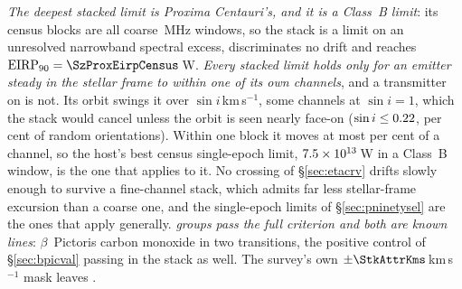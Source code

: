 \emph{The deepest stacked limit is Proxima Centauri's, and it is a Class~B
limit}: its \SxProxEbCensus{} census blocks are all coarse \ChanBModeMHz\,MHz
windows, so the stack is a limit on an unresolved narrowband spectral
excess, discriminates
no drift and reaches $\mathrm{EIRP}_{90}=\SzProxEirpCensus$\,W. \emph{Every
stacked limit holds only for an emitter steady in the stellar frame to within
one of its own channels}, and a transmitter on \PxPlanet{} is not. Its orbit
\citep{AngladaEscude2016,Kervella2017,NEA2013} swings it over
\PxPPKms$\sin i$\,km\,s$^{-1}$, some \PxNChanWalk{} channels at $\sin i=1$,
which the stack would cancel unless the orbit is seen nearly face-on
($\sin i\le0.22$, \PxIsoPct{} per cent of random orientations). Within one block it moves at most \PxBlockPct{} per cent of a channel, so the
host's best census single-epoch limit, $7.5\times10^{13}$\,W in a Class~B
window, is the one that applies to it. No crossing of
\S\ref{sec:etacrv} drifts slowly enough to survive a fine-channel stack,
which admits far less stellar-frame excursion than a coarse one, and the
single-epoch limits of \S\ref{sec:pninetysel} are
the ones that apply generally. \emph{\StkNSurvive{} groups pass the full
criterion and both are known lines}: $\beta$~Pictoris carbon monoxide in two
transitions, the positive control of \S\ref{sec:bpicval} passing in the stack
as well. The survey's own $\pm\StkAttrKms$\,km\,s$^{-1}$ mask leaves
\StkUnattrClause.

